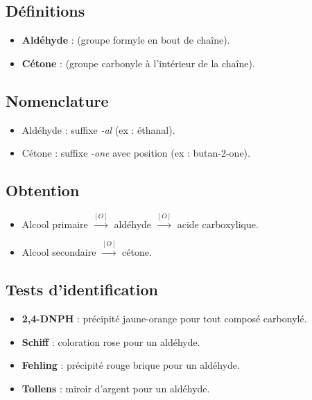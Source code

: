 \begin{synthese}
\subsection*{Définitions}
\begin{itemize}
    \item \textbf{Aldéhyde} :  (groupe formyle en bout de chaîne).
    \item \textbf{Cétone} :  (groupe carbonyle à l'intérieur de la chaîne).
\end{itemize}

\subsection*{Nomenclature}
\begin{itemize}
    \item Aldéhyde : suffixe \textit{-al} (ex : éthanal).
    \item Cétone : suffixe \textit{-one} avec position (ex : butan-2-one).
\end{itemize}

\subsection*{Obtention}
\begin{itemize}
    \item Alcool primaire $\xrightarrow{[O]}$ aldéhyde $\xrightarrow{[O]}$ acide carboxylique.
    \item Alcool secondaire $\xrightarrow{[O]}$ cétone.
\end{itemize}

\subsection*{Tests d'identification}
\begin{itemize}
    \item \textbf{2,4-DNPH} : précipité jaune-orange pour tout composé carbonylé.
    \item \textbf{Schiff} : coloration rose pour un aldéhyde.
    \item \textbf{Fehling} : précipité rouge brique  pour un aldéhyde.
    \item \textbf{Tollens} : miroir d'argent pour un aldéhyde.
\end{itemize}


\end{synthese}

